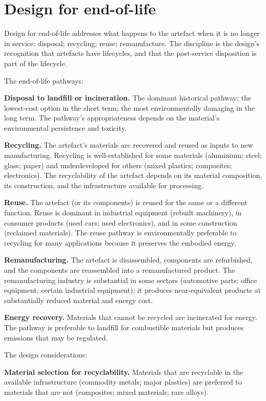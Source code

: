 \section{Design for end-of-life}

Design for end-of-life addresses what happens to the artefact when it is no longer in service: disposal; recycling; reuse; remanufacture. The discipline is the design's recognition that artefacts have lifecycles, and that the post-service disposition is part of the lifecycle.

The end-of-life pathways:

\textbf{Disposal to landfill or incineration.} The dominant historical pathway; the lowest-cost option in the short term; the most environmentally damaging in the long term. The pathway's appropriateness depends on the material's environmental persistence and toxicity.

\textbf{Recycling.} The artefact's materials are recovered and reused as inputs to new manufacturing. Recycling is well-established for some materials (aluminium; steel; glass; paper) and underdeveloped for others (mixed plastics; composites; electronics). The recyclability of the artefact depends on its material composition, its construction, and the infrastructure available for processing.

\textbf{Reuse.} The artefact (or its components) is reused for the same or a different function. Reuse is dominant in industrial equipment (rebuilt machinery), in consumer products (used cars; used electronics), and in some construction (reclaimed materials). The reuse pathway is environmentally preferable to recycling for many applications because it preserves the embodied energy.

\textbf{Remanufacturing.} The artefact is disassembled, components are refurbished, and the components are reassembled into a remanufactured product. The remanufacturing industry is substantial in some sectors (automotive parts; office equipment; certain industrial equipment); it produces near-equivalent products at substantially reduced material and energy cost.

\textbf{Energy recovery.} Materials that cannot be recycled are incinerated for energy. The pathway is preferable to landfill for combustible materials but produces emissions that may be regulated.

The design considerations:

\textbf{Material selection for recyclability.} Materials that are recyclable in the available infrastructure (commodity metals; major plastics) are preferred to materials that are not (composites; mixed materials; rare alloys).

